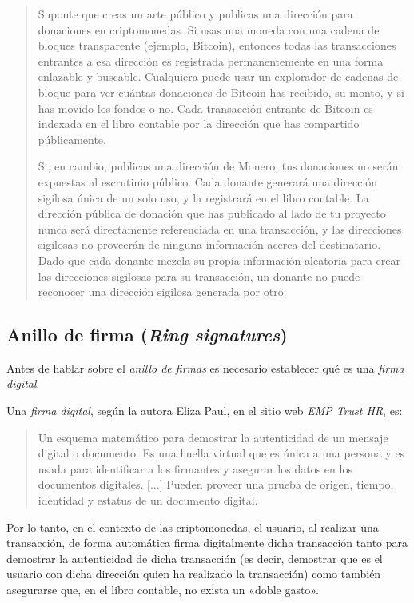 \documentclass[12pt,a4paper,twoside]{book}
\begin{document}
\begin{quotation}
Suponte que creas un arte público y publicas una dirección para donaciones en criptomonedas. Si usas una moneda con una cadena de bloques transparente (ejemplo, Bitcoin), entonces todas las transacciones entrantes a esa dirección es registrada permanentemente en una forma enlazable y buscable. Cualquiera puede usar un explorador de cadenas de bloque para ver cuántas donaciones de Bitcoin has recibido, su monto, y si has movido los fondos o no. Cada transacción entrante de Bitcoin es indexada en el libro contable por la dirección que has compartido públicamente.

Si, en cambio, publicas una dirección de Monero, tus donaciones no serán expuestas al escrutinio público. Cada donante generará una dirección sigilosa única de un solo uso, y la registrará en el libro contable. La dirección pública de donación que has publicado al lado de tu proyecto nunca será directamente referenciada en una transacción, y las direcciones sigilosas no proveerán de ninguna información acerca del destinatario. Dado que cada donante mezcla su propia información aleatoria para crear las direcciones sigilosas para su transacción, un donante no puede reconocer una dirección sigilosa generada por otro. \cite[pág. 66]{monero:master}
\end{quotation}

\subsection{Anillo de firma (\textit{Ring signatures})}
Antes de hablar sobre el \textit{anillo de firmas} es necesario establecer qué es una \textit{firma digital}.

Una \textit{firma digital}, según la autora Eliza Paul, en el sitio web \textit{EMP Trust HR}, es:

\begin{quotation}
Un esquema matemático para demostrar la autenticidad de un mensaje digital o documento. Es una huella virtual que es única a una persona y es usada para identificar a los firmantes y asegurar los datos en los documentos digitales. [...] Pueden proveer una prueba de origen, tiempo, identidad y estatus de un documento digital. \cite{firmas-digitales}
\end{quotation}

Por lo tanto, en el contexto de las criptomonedas, el usuario, al realizar una transacción, de forma automática firma digitalmente dicha transacción tanto para demostrar la autenticidad de dicha transacción (es decir, demostrar que es el usuario con dicha dirección quien ha realizado la transacción) como también asegurarse que, en el libro contable, no exista un «doble gasto».
\end{document}
